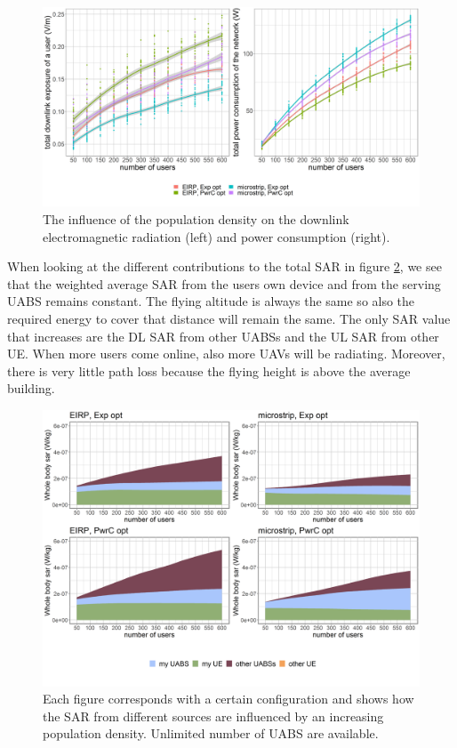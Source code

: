 \begin{figure}[h!]
  \includegraphics[width=\textwidth]{../results/s3/uvsdlAndPc.png}
  \caption{The influence of the population density on the downlink electromagnetic radiation (left) and power consumption (right).}
  \label{fig:s3b_dlAndPC}
\end{figure}

When looking at the different contributions to the total \gls{SAR} in figure \ref{fig:s3b_fourSourcesMatrix}, 
we see that the weighted average 
\gls{SAR} from the users own device and from the serving \gls{UABS} remains constant. The flying altitude is always the same so 
also the required energy to cover that distance will remain the same. 
The only \gls{SAR} value that increases are the \gls{DL} \gls{SAR} from other \gls{UABS}s and the \gls{UL} \gls{SAR} from other \gls{UE}. 
When more users come online, also more \gls{UAV}s will be radiating. Moreover, there is very little path loss because the flying height is above the average building.

\begin{figure}[h!]
  \includegraphics[width=\textwidth]{../results/s3/uFourSources.png}
  \caption{Each figure corresponds with a certain configuration and shows how the \gls{SAR} 
  from different sources are influenced by an increasing population density. Unlimited number of \gls{UABS} are available.
  }
  \label{fig:s3b_fourSourcesMatrix}
\end{figure}
